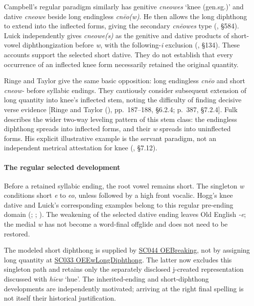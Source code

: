 \documentclass[
  british,
  a4paper,
]{article}
\begin{document}
Campbell's regular paradigm similarly has genitive \emph{cneowes} `knee
(gen.sg.)' and dative \emph{cneowe} beside long endingless
\emph{cnēo(w)}. He then allows the long diphthong to extend into the
inflected forms, giving the secondary \emph{cnēowes} type
(, §584). Luick
independently gives \emph{cneowe(s)} as the genitive and dative products
of short-vowel diphthongization before \emph{w}, with the
following-\emph{i} exclusion (, §134). These accounts support the selected short
dative. They do not establish that every occurrence of an inflected knee
form necessarily retained the original quantity.

Ringe and Taylor give the same basic opposition: long endingless
\emph{cnēo} and short \emph{cneow-} before syllabic endings. They
cautiously consider subsequent extension of long quantity into knee's
inflected stem, noting the difficulty of finding decisive verse evidence
{[}Ringe and Taylor (),
pp.~187--188, §6.2.4; p.~387, §7.2.4{]}. Fulk describes the wider
two-way leveling pattern of this stem class: the endingless diphthong
spreads into inflected forms, and their \emph{w} spreads into
uninflected forms. His explicit illustrative example is the servant
paradigm, not an independent metrical attestation for knee
(, §7.12).

\paragraph{The regular selected
development}\label{the-regular-selected-development}

Before a retained syllabic ending, the root vowel remains short. The
singleton \emph{w} conditions short \emph{e} to \emph{eo}, unless
followed by a high front vocalic. Hogg's knee dative and Luick's
corresponding examples belong to this regular pre-ending domain
(;
;
). The
weakening of the selected dative ending leaves Old English \emph{-e};
the medial \emph{w} has not become a word-final offglide and does not
need to be restored.

The modeled short diphthong is supplied by
\hyperref[rule-OEBreaking]{SC044 OEBreaking}, not by assigning long
quantity at \hyperref[rule-OEEwLongDiphthong]{SC033 OEEwLongDiphthong}.
The latter now excludes this singleton path and retains only the
separately disclosed j-created representation discussed with \emph{hīew}
`hue'. The inherited-ending and short-diphthong developments are
independently motivated; arriving at the right final spelling is not
itself their historical justification.
\end{document}

